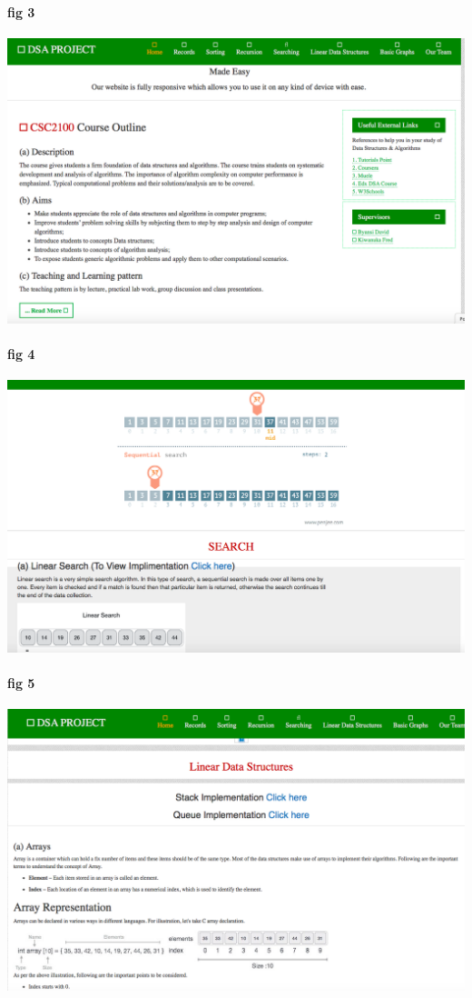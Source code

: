 \documentclass{article}
\begin{document}
\paragraph{fig 3}

\includegraphics[width=1.0\textwidth]{./csoutline}\\[0.1in]

\paragraph{fig 4}

\includegraphics[width=1.0\textwidth]{./search}\\[0.1in]

\paragraph{fig 5}

\includegraphics[width=1.0\textwidth]{./linear}\\[0.1in]
\end{document}
